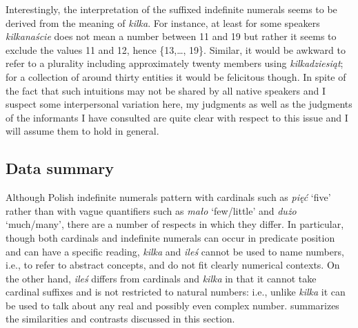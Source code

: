 \documentclass[output=paper,
]{langscibook}
\begin{document}
	\noindent Interestingly, the interpretation of the suffixed indefinite numerals seems to be derived from the meaning of \textit{kilka}. For instance, at least for some speakers \textit{kilkanaście} does not mean a number between 11 and 19 but rather it seems to exclude the values 11 and 12, hence \{13,\dots, 19\}. Similar, it would be awkward to refer to a plurality including approximately twenty members using \textit{kilkadziesiąt}; for a collection of around thirty entities it would be felicitous though. In spite of the fact that such intuitions may not be shared by all native speakers and I suspect some interpersonal variation here, my judgments as well as the judgments of the informants I have consulted are quite clear with respect to this issue and I will assume them to hold in general. 
	
	\subsection{Data summary}\label{sec:data-summary2}
	
	Although Polish indefinite numerals pattern with cardinals such as \textit{pięć} `five' rather than with vague quantifiers such as \textit{mało} `few/little' and \textit{dużo} `much/many', there are a number of respects in which they differ. In particular, though both cardinals and indefinite numerals can occur in predicate position and can have a specific reading, \textit{kilka} and \textit{ileś} cannot be used to name numbers, i.e., to refer to abstract concepts, and do not fit clearly numerical contexts. On the other hand, \textit{ileś} differs from cardinals and \textit{kilka} in that it cannot take cardinal suffixes and is not restricted to natural numbers: i.e., unlike \textit{kilka} it can be used to talk about any real and possibly even complex number.  summarizes the similarities and contrasts discussed in this section.
	
\end{document}
